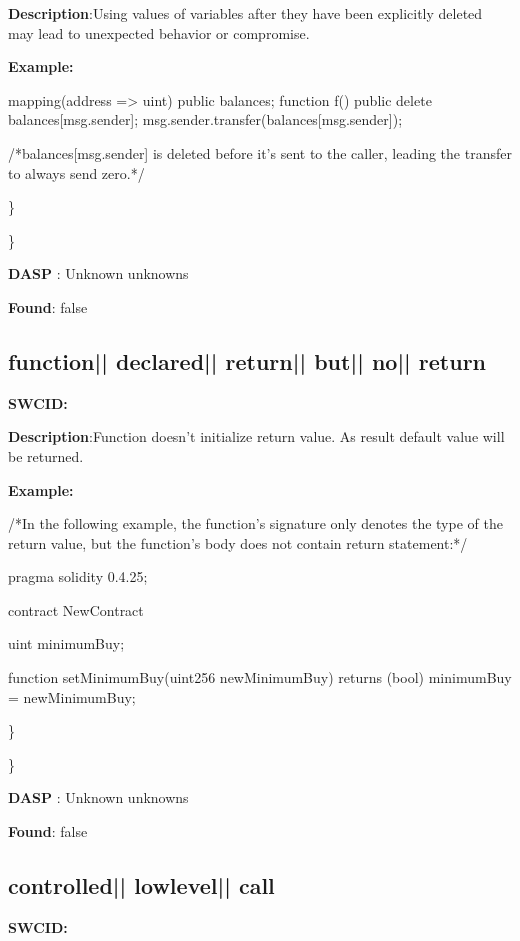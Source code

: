\documentclass{article}
\begin{document}
\textbf{Description}:Using values of variables after they have been explicitly deleted may lead to unexpected behavior or compromise.


\textbf{Example:} 
\begin{ffcode} 

mapping(address => uint) public balances;
function f() public {
    delete balances[msg.sender];
    msg.sender.transfer(balances[msg.sender]);
}

 /*balances[msg.sender] is deleted before it's sent to the caller, leading the transfer to always send zero.*/ 

\end{ffcode} 
\} 

\} 

\textbf{DASP} : Unknown unknowns

\textbf{Found}: false

\subsection{function{|\textunderscore| }declared{|\textunderscore| }return{|\textunderscore| }but{|\textunderscore| }no{|\textunderscore| }return} 
\textbf{SWC{\textunderscore }ID:} 

\textbf{Description}:Function doesn't initialize return value. As result default value will be returned.


\textbf{Example:} 
\begin{ffcode} 

/*In the following example, the function's signature only denotes the type of the return value, but the function's body does not contain return statement:*/ 

pragma solidity 0.4.25;

contract NewContract {
    uint minimumBuy;

    function setMinimumBuy(uint256 newMinimumBuy) returns (bool){
        minimumBuy = newMinimumBuy;
    }
}

\end{ffcode} 
\} 

\} 

\textbf{DASP} : Unknown unknowns

\textbf{Found}: false

\subsection{controlled{|\textunderscore| }lowlevel{|\textunderscore| }call} 
\textbf{SWC{\textunderscore }ID:} 
\end{document}
